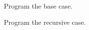 
\begin{Parts}

\Part Program the base case.

\begin{solution}
\end{solution}

\Part Program the recursive case.

\begin{solution}
\end{solution}

\end{Parts}

